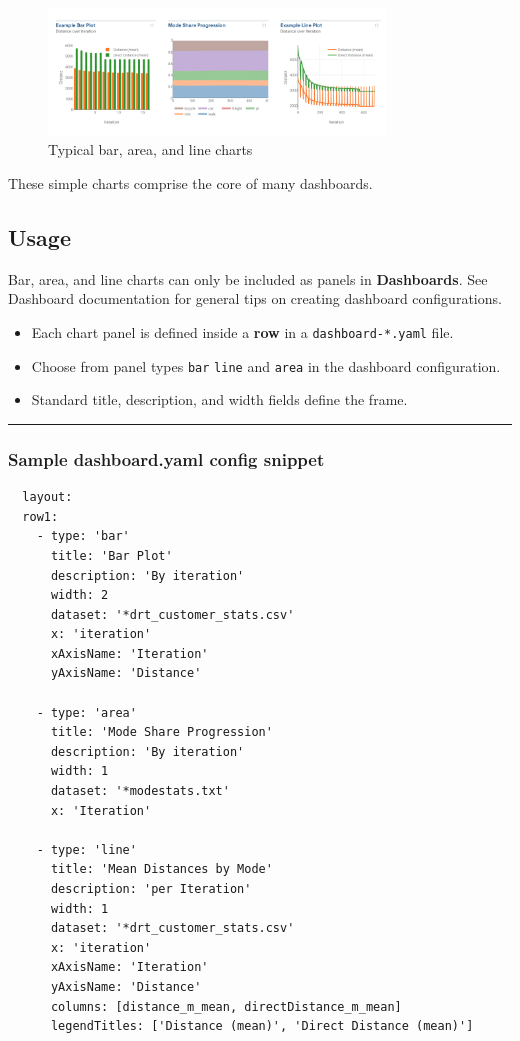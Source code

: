 \begin{figure}[H]
  \centering
  \includegraphics[width=0.8\textwidth]{assets/bar-line.png}
  \caption{Typical bar, area, and line charts}
\end{figure}

These simple charts comprise the core of many dashboards.

\hypertarget{usage}{%
\subsection{Usage}}

Bar, area, and line charts can only be included as panels in
\textbf{Dashboards}. See Dashboard documentation for general tips on
creating dashboard configurations.

\begin{itemize}
\tightlist
\item
  Each chart panel is defined inside a \textbf{row} in a
  \texttt{dashboard-*.yaml} file.
\item
  Choose from panel types \texttt{bar} \texttt{line} and \texttt{area}
  in the dashboard configuration.
\item
  Standard title, description, and width fields define the frame.
\end{itemize}

\begin{center}\rule{0.5\linewidth}{0.5pt}\end{center}

\hypertarget{sample-dashboard.yaml-config-snippet}{%
\subsubsection{Sample dashboard.yaml config
snippet}\label{sample-dashboard.yaml-config-snippet}}

\begin{lstlisting}
  layout:
  row1:
    - type: 'bar'
      title: 'Bar Plot'
      description: 'By iteration'
      width: 2
      dataset: '*drt_customer_stats.csv'
      x: 'iteration'
      xAxisName: 'Iteration'
      yAxisName: 'Distance'

    - type: 'area'
      title: 'Mode Share Progression'
      description: 'By iteration'
      width: 1
      dataset: '*modestats.txt'
      x: 'Iteration'

    - type: 'line'
      title: 'Mean Distances by Mode'
      description: 'per Iteration'
      width: 1
      dataset: '*drt_customer_stats.csv'
      x: 'iteration'
      xAxisName: 'Iteration'
      yAxisName: 'Distance'
      columns: [distance_m_mean, directDistance_m_mean]
      legendTitles: ['Distance (mean)', 'Direct Distance (mean)']

\end{lstlisting}


